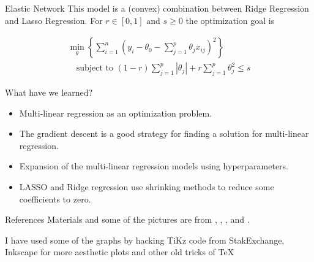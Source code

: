 \documentclass{beamer}
\begin{document}
\begin{frame}{Elastic Network}
This model is a (convex) combination between Ridge Regression and Lasso Regression. For $r \in [0,1]$ and $s \ge 0$ the optimization goal is

\begin{equation*}
	\begin{split}
\min_{\theta} \left\{ \sum_{i=1}^n \left( y_i - \theta_0 - \sum_{j=1}^p \theta_j x_{ij} \right)^2 \right\}  \\
\quad\textrm{subject to }   (1-r)\sum_{j=1}^p |\theta_j | + r \sum_{j=1}^p \theta_j^2 \le s
	\end{split}
\end{equation*} 

\end{frame}

\begin{frame}{What have we learned?}
	\begin{itemize}
		\item Multi-linear regression as an optimization problem.
		\item The gradient descent is a good strategy for finding a solution for multi-linear regression.
		\item Expansion of the multi-linear regression models using hyperparameters. 
		\item LASSO and Ridge regression use shrinking methods to reduce some coefficients to zero.	
	\end{itemize}
\end{frame}


\begin{frame}{References}
Materials and some of the pictures are from \citep{James2015}, \citep{duda}, \citep{geron2}, and \citep{pestman}.
\printbibliography 	

I have used some of the graphs by hacking TiKz code from StakExchange, Inkscape for more aesthetic plots and other old tricks of \TeX
\end{frame}		
\end{document}
